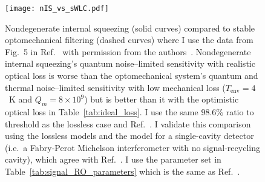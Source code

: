 \begin{figure}
	\centering
	\texttt{[image: nIS\_vs\_sWLC.pdf]}
	\caption{Nondegenerate internal squeezing (solid curves) compared to stable optomechanical filtering (dashed curves) where I use the data from Fig.~5 in Ref.~\cite{liBroadbandSensitivityImprovement2020} with permission from the authors~\cite{xiangLiPersonalCommunication}. Nondegenerate internal squeezing's quantum noise--limited sensitivity with realistic optical loss is worse than the optomechanical system's quantum and thermal noise--limited sensitivity with low mechanical loss ($T_\text{env}=4$~K and $Q_m=8\times10^9$) but is better than it with the optimistic optical loss in Table~\ref{tab:ideal_loss}. I use the same $98.6\%$ ratio to threshold as the lossless case and Ref.~\cite{liBroadbandSensitivityImprovement2020}. I validate this comparison using the lossless models and the model for a single-cavity detector (i.e.\ a Fabry-Perot Michelson interferometer with no signal-recycling cavity), which agree with Ref.~\cite{liBroadbandSensitivityImprovement2020}. I use the parameter set in Table~\ref{tab:signal_RO_parameters} which is the same as Ref.~\cite{liBroadbandSensitivityImprovement2020}.}
	\label{fig:nIS_vs_sWLC}
\end{figure}

